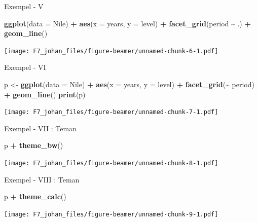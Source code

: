 \documentclass[
  11pt,
  ignorenonframetext,
  handout]{beamer}
\newenvironment{Shaded}{\begin{snugshade}}{\end{snugshade}}
\newcommand{\AttributeTok}[1]{\textcolor[rgb]{0.13,0.29,0.53}{#1}}
\newcommand{\FunctionTok}[1]{\textcolor[rgb]{0.13,0.29,0.53}{\textbf{#1}}}
\newcommand{\NormalTok}[1]{#1}
\newcommand{\OtherTok}[1]{\textcolor[rgb]{0.56,0.35,0.01}{#1}}
\newcommand{\SpecialCharTok}[1]{\textcolor[rgb]{0.81,0.36,0.00}{\textbf{#1}}}
\begin{document}
\begin{frame}[fragile]{Exempel - V}
\label{exempel---v}
\begin{Shaded}
\begin{Highlighting}[]
\FunctionTok{ggplot}\NormalTok{(}\AttributeTok{data =}\NormalTok{ Nile) }\SpecialCharTok{+} 
  \FunctionTok{aes}\NormalTok{(}\AttributeTok{x =}\NormalTok{ years, }\AttributeTok{y =}\NormalTok{ level) }\SpecialCharTok{+} 
  \FunctionTok{facet\_grid}\NormalTok{(period }\SpecialCharTok{\textasciitilde{}}\NormalTok{ .) }\SpecialCharTok{+} 
  \FunctionTok{geom\_line}\NormalTok{()}
\end{Highlighting}
\end{Shaded}

\texttt{[image: F7\_johan\_files/figure-beamer/unnamed-chunk-6-1.pdf]}
\end{frame}

\begin{frame}[fragile]{Exempel - VI}
\label{exempel---vi}
\begin{Shaded}
\begin{Highlighting}[]
\NormalTok{p }\OtherTok{\textless{}{-}} \FunctionTok{ggplot}\NormalTok{(}\AttributeTok{data =}\NormalTok{ Nile) }\SpecialCharTok{+} 
  \FunctionTok{aes}\NormalTok{(}\AttributeTok{x =}\NormalTok{ years, }\AttributeTok{y =}\NormalTok{ level) }\SpecialCharTok{+} 
  \FunctionTok{facet\_grid}\NormalTok{(}\SpecialCharTok{\textasciitilde{}}\NormalTok{ period) }\SpecialCharTok{+} 
  \FunctionTok{geom\_line}\NormalTok{()}
\FunctionTok{print}\NormalTok{(p)}
\end{Highlighting}
\end{Shaded}

\texttt{[image: F7\_johan\_files/figure-beamer/unnamed-chunk-7-1.pdf]}
\end{frame}

\begin{frame}[fragile]{Exempel - VII : Teman}
\label{exempel---vii-teman}
\begin{Shaded}
\begin{Highlighting}[]
\NormalTok{p }\SpecialCharTok{+} \FunctionTok{theme\_bw}\NormalTok{()}
\end{Highlighting}
\end{Shaded}

\texttt{[image: F7\_johan\_files/figure-beamer/unnamed-chunk-8-1.pdf]}
\end{frame}

\begin{frame}[fragile]{Exempel - VIII : Teman}
\label{exempel---viii-teman}
\begin{Shaded}
\begin{Highlighting}[]
\NormalTok{p }\SpecialCharTok{+} \FunctionTok{theme\_calc}\NormalTok{()}
\end{Highlighting}
\end{Shaded}

\texttt{[image: F7\_johan\_files/figure-beamer/unnamed-chunk-9-1.pdf]}
\end{frame}
\end{document}

